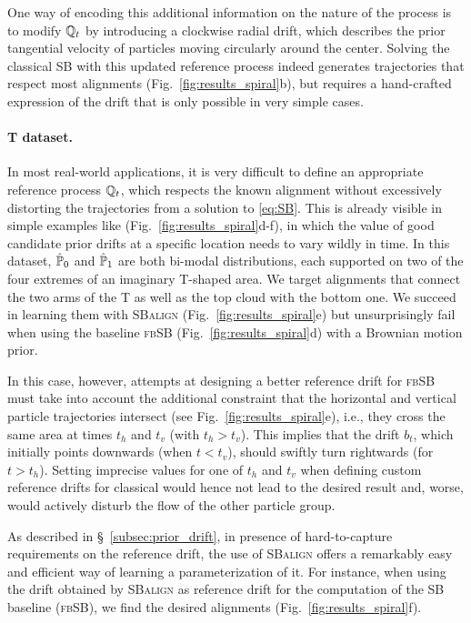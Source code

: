 One way of encoding this additional information on the nature of the process is to modify $\mathbb{Q}_{ t }$ by introducing a clockwise radial drift, which describes the prior tangential velocity of particles moving circularly around the center.
Solving the classical SB with this updated reference process indeed generates trajectories that respect most alignments (Fig.~\ref{fig:results_spiral}b), but requires a hand-crafted expression of the drift that is only possible in very simple cases.

\paragraph{T dataset.}
In most real-world applications, it is very difficult to define an appropriate reference process $\mathbb{Q}_{ t }$, which respects the known alignment without excessively distorting the trajectories from a solution to \eqref{eq:SB}. This is already visible in simple examples like (Fig.~\ref{fig:results_spiral}d-f), in which the value of good candidate prior drifts at a specific location needs to vary wildly in time.
In this dataset, $\hat{\mathbb{P}}_{ {0} }$ and $\hat{\mathbb{P}}_{ {1}}$ are both bi-modal distributions, each supported on two of the four extremes of an imaginary T-shaped area.
We target alignments that connect the two arms of the T as well as the top cloud with the bottom one. We succeed in learning them with \textsc{SBalign} (Fig.~\ref{fig:results_spiral}e) but unsurprisingly fail when using the baseline \textsc{fbSB} (Fig.~\ref{fig:results_spiral}d) with a Brownian motion prior.

 In this case, however, attempts at designing a better reference drift for \textsc{fbSB} must take into account the additional constraint that the horizontal and vertical particle trajectories intersect (see Fig.~\ref{fig:results_spiral}e), i.e., they cross the same area at times $t_h$ and $t_v$ (with $t_h > t_v$). This implies that the drift $b_t$, which initially points downwards (when $t < t_v$), should swiftly turn rightwards (for $t > t_h$).
Setting imprecise values for one of $t_h$ and $t_v$ when defining custom reference drifts for classical  would hence not lead to the desired result and, worse, would actively disturb the flow of the other particle group.

 As described in \S~\ref{subsec:prior_drift}, in presence of hard-to-capture requirements on the reference drift, the use of \textsc{SBalign} offers a remarkably easy and efficient way of learning a parameterization of it. For instance, when using the drift obtained by \textsc{SBalign} as reference drift for the computation of the SB baseline (\textsc{fbSB}), we find the desired alignments (Fig.~\ref{fig:results_spiral}f).

